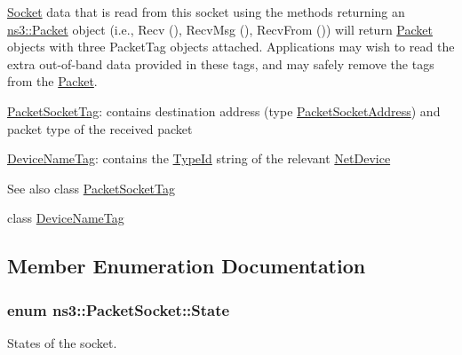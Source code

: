 \hyperlink{classns3_1_1Socket}{Socket} data that is read from this socket using the methods returning an \hyperlink{classns3_1_1Packet}{ns3\+::\+Packet} object (i.\+e., Recv (), Recv\+Msg (), Recv\+From ()) will return \hyperlink{classns3_1_1Packet}{Packet} objects with three Packet\+Tag objects attached. Applications may wish to read the extra out-\/of-\/band data provided in these tags, and may safely remove the tags from the \hyperlink{classns3_1_1Packet}{Packet}.


\begin{DoxyItemize}
\item \hyperlink{classns3_1_1PacketSocketTag}{Packet\+Socket\+Tag}\+: contains destination address (type \hyperlink{classns3_1_1PacketSocketAddress}{Packet\+Socket\+Address}) and packet type of the received packet
\item \hyperlink{classns3_1_1DeviceNameTag}{Device\+Name\+Tag}\+: contains the \hyperlink{classns3_1_1TypeId}{Type\+Id} string of the relevant \hyperlink{classns3_1_1NetDevice}{Net\+Device}
\end{DoxyItemize}

\begin{DoxySeeAlso}{See also}
class \hyperlink{classns3_1_1PacketSocketTag}{Packet\+Socket\+Tag} 

class \hyperlink{classns3_1_1DeviceNameTag}{Device\+Name\+Tag} 
\end{DoxySeeAlso}


\subsection{Member Enumeration Documentation}
\subsubsection[{\texorpdfstring{State}{State}}]{\setlength{\rightskip}{0pt plus 5cm}enum {\bf ns3\+::\+Packet\+Socket\+::\+State}\hspace{0.3cm}{\ttfamily [private]}}\hypertarget{classns3_1_1PacketSocket_a376c65cdab494c41bd65f9aaeef543e5}{}\label{classns3_1_1PacketSocket_a376c65cdab494c41bd65f9aaeef543e5}


States of the socket. 

